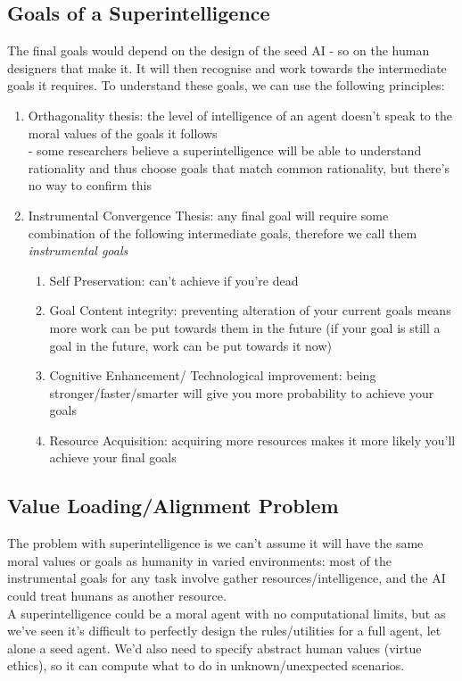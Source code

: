 \subsection{Goals of a Superintelligence}
The final goals would depend on the design of the seed AI - so on the human designers that make it. It will then recognise and work towards the intermediate goals it requires. To understand these goals, we can use the following principles:
\begin{enumerate}
    \item Orthagonality thesis: the level of intelligence of an agent doesn't speak to the moral values of the goals it follows\\
    \qquad - some researchers believe a superintelligence will be able to understand rationality and thus choose goals that match common rationality, but there's no way to confirm this
    \item Instrumental Convergence Thesis: any final goal will require some combination of the following intermediate goals, therefore we call them \emph{instrumental goals} \begin{enumerate}
        \item Self Preservation: can't achieve if you're dead
        \item Goal Content integrity: preventing alteration of your current goals means more work can be put towards them in the future (if your goal is still a goal in the future, work can be put towards it now)
        \item Cognitive Enhancement/ Technological improvement: being stronger/faster/smarter will give you more probability to achieve your goals
        \item Resource Acquisition: acquiring more resources makes it more likely you'll achieve your final goals
    \end{enumerate}
\end{enumerate}

\subsection{Value Loading/Alignment Problem}
The problem with superintelligence is we can't assume it will have the same moral values or goals as humanity in varied environments: most of the instrumental goals for any task involve gather resources/intelligence, and the AI could treat humans as another resource.\\

A superintelligence could be a moral agent with no computational limits, but as we've seen it's difficult to perfectly design the rules/utilities for a full agent, let alone a seed agent. We'd also need to specify abstract human values (virtue ethics), so it can compute what to do in unknown/unexpected scenarios.\\ 

